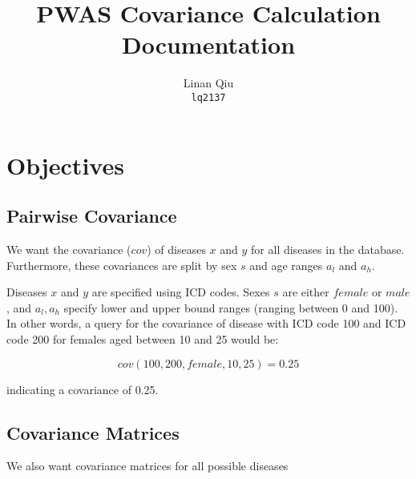 \documentclass[11pt]{scrartcl}
\title{PWAS Covariance Calculation Documentation}
\author{Linan Qiu\\\texttt{lq2137}}
\begin{document}
\maketitle

\section{Objectives}

\subsection{Pairwise Covariance}

We want the covariance ($cov$) of diseases $x$ and $y$ for all diseases in the database. Furthermore, these covariances are split by sex $s$ and age ranges $a_l$ and $a_h$.

Diseases $x$ and $y$ are specified using ICD codes. Sexes $s$ are either $female$ or $male$, and $a_l, a_h$ specify lower and upper bound ranges (ranging between 0 and 100). In other words, a query for the covariance of disease with ICD code 100 and ICD code 200 for females aged between 10 and 25 would be:

\[cov(100, 200, female, 10, 25) = 0.25\]

indicating a covariance of 0.25.

\subsection{Covariance Matrices}

We also want covariance matrices for all possible diseases 
\end{document}
